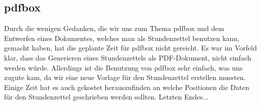 \subsection{pdfbox} %
Durch die wenigen Gedanken, die wir uns zum Thema pdfbox und dem Entwerfen eines Dokumentes, welches man als Stundenzettel benutzen kann, gemacht haben, hat die geplante Zeit für pdfbox nicht gereicht. Es war im Vorfeld klar, dass das Generieren eines Stundenzettels als PDF-Dokument, nicht einfach werden würde.
Allerdings ist die Benutzung von pdfbox sehr einfach, was uns zugute kam, da wir eine neue Vorlage für den Stundenzettel erstellen mussten. Einige Zeit hat es auch gekostet herauszufinden an welche Positionen die Daten für den Stundenzettel geschrieben werden sollten.
Letzten Endes...

